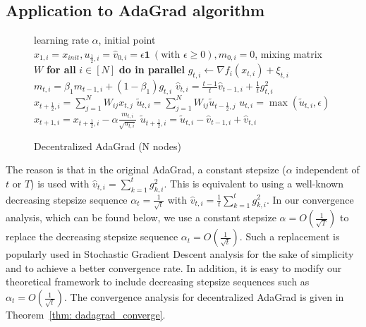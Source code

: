 \documentclass[anon,12pt]{colt2021} %
\begin{document}
\subsection{Application to AdaGrad algorithm}\label{sec:adagrad}
\vspace{-0.05in}
\begin{figure}\vspace{-1.6cm}
\begin{minipage}{\linewidth}
\begin{algorithm}[H]
	\caption{Decentralized AdaGrad (N nodes)}\label{alg: dadagrad}
	\begin{algorithmic}[1]
		 learning rate $\alpha$, initial point $x_{1,i} = x_{init}, u_{\frac{1}{2},i} = \hat v_{0,i} = \epsilon \mathbf 1\ (\text{with } \epsilon \geq 0), m_{0,i}=0$, mixing matrix $W$ 
		\STATE \textbf{for all }$i \in [N]$ \textbf{do in parallel}
 		\STATE \quad $g_{t,i}  \leftarrow \nabla f_i(x_{t,i}) + \xi_{t,i}$
 		\STATE \quad $m_{t,i} = \beta_1 m_{t-1,i} + (1-\beta_1) g_{t,i}$ 
 		\STATE \quad $ \hat v_{t,i} = \frac{t-1}{t} \hat v_{t-1,i} + \frac{1}{t} g_{t,i}^2 $
 		\STATE \quad $x_{t+\frac{1}{2},i} = \sum_{j=1}^N W_{ij}x_{t,j}$
 		\STATE \quad $\tilde u_{t,i} = \sum_{j=1}^N W_{ij}\tilde u_{t-\frac{1}{2},j}$
 	    \STATE \quad $u_{t,i} = \max(\tilde u_{t,i}, \epsilon)$
 		\STATE \quad $x_{t+1,i} = x_{t+\frac{1}{2},i} - \alpha \frac{m_{t,i}}{\sqrt{u_{t,i}}}$
 		\STATE \quad $\tilde u_{t+\frac{1}{2},i} = \tilde u_{t,i} - \hat v_{t-1,i} + \hat v_{t,i}$
 		\ENDFOR
 	\end{algorithmic}
 \end{algorithm}
\end{minipage}
\end{figure}
The reason is that in the original AdaGrad, a constant stepsize ($\alpha$ independent of $t$ or $T$) is used with  $\hat v_{t,i} = {\sum_{k=1}^t g_{k,i}^2}$. 
This is equivalent to using a well-known decreasing stepsize sequence $\alpha_t = \frac{1}{\sqrt{t}}$ with  $\hat v_{t,i} = {\frac{1}{t}\sum_{k=1}^t g_{k,i}^2}$. 
In our convergence analysis, which can be found below, we use a constant stepsize $\alpha = O(\frac{1}{\sqrt{T}})$ to replace the decreasing stepsize sequence $\alpha_t =  O(\frac{1}{\sqrt{t}})$. 
Such a replacement is popularly used in Stochastic Gradient Descent analysis for the sake of simplicity and to achieve a better convergence rate. 
In addition, it is easy to modify our theoretical framework to include decreasing stepsize sequences such as $\alpha_t =  O(\frac{1}{\sqrt{
t}})$.
The convergence analysis for decentralized AdaGrad is given in Theorem~\ref{thm: dadagrad_converge}.
\end{document}
